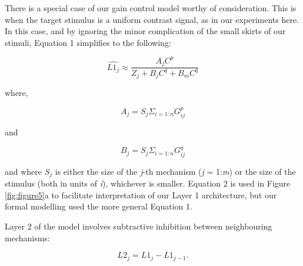 \documentclass[
]{article}
\begin{document}
There is a special case of our gain control model worthy of consideration. This is when the target stimulus is a uniform contrast signal, as in our experiments here. In this case, and by ignoring the minor complication of the small skirts of our stimuli, Equation 1 simplifies to the following:

\begin{equation}
  \widehat{L1_j} \approx \frac{A_{j} C^{p}} {Z_{j} + B_{j}C^{q} + B_{m}C^{q}}
\end{equation}

where,

\begin{equation}
  A_{j} = S_{j} \Sigma_{i = 1:n} G_{ij}^{p}
\end{equation}

and

\begin{equation}
  B_{j} = S_{j} \Sigma_{i = 1:n} G_{ij}^{q}
\end{equation}

and where \(S_j\) is either the size of the \emph{j}-th mechanism (\emph{j} = 1:\emph{m}) or the size of the stimulus (both in units of \emph{i}), whichever is smaller. Equation 2 is used in Figure \ref{fig:figure5}a to facilitate interpretation of our Layer 1 architecture, but our formal modelling used the more general Equation 1.

Layer 2 of the model involves subtractive inhibition between neighbouring mechanisms:

\begin{equation}
  L2_{j} = L1_{j} - L1_{j-1}.
\end{equation}
\end{document}
